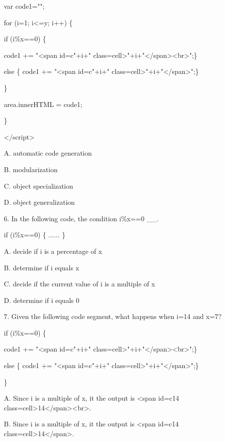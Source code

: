\documentclass[
]{article}
\begin{document}
\protect\hypertarget{index_split_012.htmlux5cux23p241}{}{}

var code1="";

for (i=1; i\textless=y; i++) \{

if (i\%x==0) \{

code1 += "\textless span id=c"+i+"
class=\textquotesingle cell\textquotesingle\textgreater"+i+"\textless/span\textgreater\textless br\textgreater";\}

else \{ code1 += "\textless span id=c"+i+"
class=\textquotesingle cell\textquotesingle\textgreater"+i+"\textless/span\textgreater";\}

\}

area.innerHTML = code1;

\}

\textless/script\textgreater{}

A. automatic code generation

B. modularization

C. object specialization

D. object generalization

6. In the following code, the condition i\%x==0 \_\_.

if (i\%x==0) \{ ...... \}

A. decide if i is a percentage of x

B. determine if i equals x

C. decide if the current value of i is a multiple of x

D. determine if i equals 0

7. Given the following code segment, what happens when i=14 and x=7?

if (i\%x==0) \{

code1 += "\textless span id=c"+i+"
class=\textquotesingle cell\textquotesingle\textgreater"+i+"\textless/span\textgreater\textless br\textgreater";\}

else \{ code1 += "\textless span id=c"+i+"
class=\textquotesingle cell\textquotesingle\textgreater"+i+"\textless/span\textgreater";\}

\}

A. Since i is a multiple of x, it the output is \textless span id=c14
class=\textquotesingle cell\textquotesingle\textgreater14\textless/span\textgreater\textless br\textgreater.

B. Since i is a multiple of x, it the output is \textless span id=c14
class=\textquotesingle cell\textquotesingle\textgreater14\textless/span\textgreater.
\end{document}
